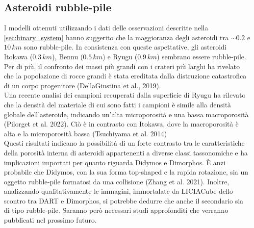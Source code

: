 \documentclass[a4paper,11pt,openright]{book}
\begin{document}
\subsection{Asteroidi rubble-pile}
I modelli ottenuti utilizzando i dati delle osservazioni descritte nella \cref{sec:binary_system} hanno suggerito che la maggioranza degli asteroidi tra $\sim 0.2$ e $10\,km$ sono rubble-pile. In consistenza con queste aspettative, gli asteroidi Itokawa ($0.3\,km$), Bennu ($0.5\,km$) e Ryugu ($0.9\,km$) sembrano essere rubble-pile. Per di più, il confronto dei massi più grandi con i crateri più larghi ha rivelato che la popolazione di rocce grandi è stata ereditata dalla distruzione catastrofica di un corpo progenitore (DellaGiustina et al., 2019).\\
Una recente analisi dei campioni recuperati dalla superficie di Ryugu ha rilevato che la densità del materiale di cui sono fatti i campioni è simile alla densità globale dell'asteroide, indicando un'alta microporosità e una bassa macroporosità (Pilorget et al. 2022). Ciò è in contrasto con Itokawa, dove la macroporosità è alta e la microporosità bassa (Tsuchiyama et al. 2014)\\
Questi risultati indicano la possibilità di un forte contrasto tra le caratteristiche della porosità interna di asteroidi appartenenti a diverse classi tassonomiche e ha implicazioni importati per quanto riguarda Didymos e Dimorphos. È anzi probabile che Didymos, con la sua forma top-shaped e la rapida rotazione, sia un oggetto rubble-pile formatosi da una collisione (Zhang et al. 2021). Inoltre, analizzando qualitativamente le immagini, immortalate da LICIACube dello scontro tra DART e Dimorphos, si potrebbe dedurre che anche il secondario sia di tipo rubble-pile. Saranno però necessari studi approfonditi che verranno pubblicati nel prossimo futuro.
\end{document}
